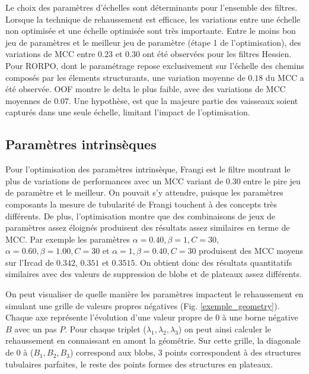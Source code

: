 Le choix des paramètres d'échelles sont déterminants pour l'ensemble des filtres. Lorsque la technique de rehaussement est efficace, les variations entre une échelle non optimisée et une échelle optimisée sont très importante. Entre le moins bon jeu de paramètres et le meilleur jeu de paramètre (étape 1 de l'optimisation), des variations de MCC entre $0.23$ et $0.30$ ont été observées pour les filtres Hessien. Pour RORPO, dont le paramétrage repose exclusivement sur l'échelle des chemins composés par les élements structurants, une variation moyenne de $0.18$ du MCC a été observée. OOF montre le delta le plus faible, avec des variations de MCC moyennes de $0.07$. Une hypothèse, est que la majeure partie des vaisseaux soient capturés dans une seule échelle, limitant l'impact de l'optimisation.

\subsection{Paramètres intrinsèques}

Pour l'optimisation des paramètres intrinsèque, Frangi est le filtre montrant le plus de variations de performances avec un MCC variant de $0.30$ entre le pire jeu de paramètre et le meilleur. On pouvait s'y attendre, puisque les paramètres composants la mesure de tubularité de Frangi touchent à des concepts très différents. De plus, l'optimisation montre que des combinaisons de jeux de paramètres assez éloignés produisent des résultats assez similaires en terme de MCC. Par exemple les paramètres $\alpha=0.40,\beta=1,C=30$, $\alpha=0.60,\beta=1.00,C=30$ et $\alpha=1,\beta=0.40,C=30$ produisent des MCC moyens sur l'Ircad de $0.342$, $0.351$ et $0.3515$. On obtient donc des résultats quantitatifs similaires avec des valeurs de suppression de blobs et de plateaux assez différents.

On peut visualiser de quelle manière les paramètres impactent le rehaussement en simulant une grille de valeurs propres négatives (Fig. \ref{exemple_geometry}). Chaque axe représente l'évolution d'une valeur propre de 0 à une borne négative $B$ avec un pas $P$. Pour chaque triplet ($\lambda_1,\lambda_2,\lambda_3$) on peut ainsi calculer le rehaussement en connaissant en amont la géométrie. Sur cette grille, la diagonale de 0 à ($B_1,B_2,B_3$) correspond aux blobs, 3 points correspondent à des structures tubulaires parfaites, le reste des points formes des structures en plateaux.

